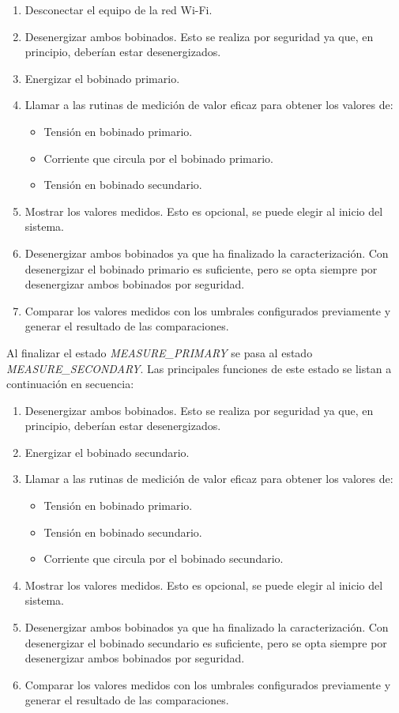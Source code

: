 \begin{enumerate}
\item Desconectar el equipo de la red Wi-Fi.
\item Desenergizar ambos bobinados. Esto se realiza por seguridad ya que, en principio, deberían estar desenergizados.
\item Energizar el bobinado primario.
\item Llamar a las rutinas de medición de valor eficaz para obtener los valores de:
\begin{itemize}
 	\item Tensión en bobinado primario.
	\item Corriente que circula por el bobinado primario.
	\item Tensión en bobinado secundario.
\end{itemize}
\item Mostrar los valores medidos. Esto es opcional, se puede elegir al inicio del sistema.
\item Desenergizar ambos bobinados ya que ha finalizado la caracterización. Con desenergizar el bobinado primario es suficiente, pero se opta siempre por desenergizar ambos bobinados por seguridad.
\item Comparar los valores medidos con los umbrales configurados previamente y generar el resultado de las comparaciones.
\end{enumerate}

Al finalizar el estado \textit{MEASURE\_PRIMARY} se pasa al estado \textit{MEASURE\_SECONDARY}. Las principales funciones de este estado se listan a continuación en secuencia:

\begin{enumerate}
\item Desenergizar ambos bobinados. Esto se realiza por seguridad ya que, en principio, deberían estar desenergizados.
\item Energizar el bobinado secundario.
\item Llamar a las rutinas de medición de valor eficaz para obtener los valores de:
\begin{itemize}
 	\item Tensión en bobinado primario.
	\item Tensión en bobinado secundario.
	\item Corriente que circula por el bobinado secundario.	
\end{itemize}
\item Mostrar los valores medidos. Esto es opcional, se puede elegir al inicio del sistema.
\item Desenergizar ambos bobinados ya que ha finalizado la caracterización. Con desenergizar el bobinado secundario es suficiente, pero se opta siempre por desenergizar ambos bobinados por seguridad.
\item Comparar los valores medidos con los umbrales configurados previamente y generar el resultado de las comparaciones.
\end{enumerate}

